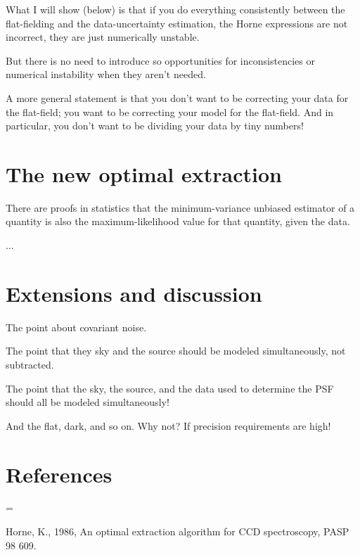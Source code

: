 \documentclass[12pt, letterpaper]{article}
\begin{document}
What I will show (below) is that if you do everything consistently
between the flat-fielding and the data-uncertainty estimation, the
Horne expressions are not incorrect, they are just numerically
unstable.

But there is no need to introduce so opportunities for inconsistencies
or numerical instability when they aren't needed.

A more general statement is that you don't want to be correcting your
data for the flat-field; you want to be correcting your model for the
flat-field.
And in particular, you don't want to be dividing your data by tiny
numbers!

\section{The new optimal extraction}

There are proofs in statistics that the minimum-variance unbiased
estimator of a quantity is also the maximum-likelihood value for that
quantity, given the data.

...

\section{Extensions and discussion}

The point about covariant noise.

The point that they sky and the source should be modeled
simultaneously, not subtracted.

The point that the sky, the source, and the data used to determine the
PSF should all be modeled simultaneously!

And the flat, dark, and so on. Why not? If precision requirements are
high!

\section*{References}
\begin{list}{}{%
\rightmargin=0in
\leftmargin=\parindent
{}\leftmargin
{}\leftmargin
}
\item Horne, K., 1986,
An optimal extraction algorithm for CCD spectroscopy,
PASP 98 609.
\end{list}
\end{document}
